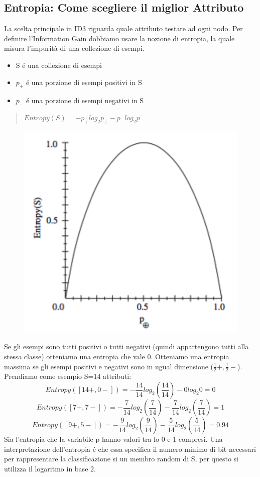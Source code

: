\documentclass{article}
\begin{document}
\subsection{Entropia: Come scegliere il miglior Attributo}
La scelta principale in ID3 riguarda quale attributo testare ad ogni nodo. Per definire l'Information Gain dobbiamo usare la nozione di entropia, la quale misura l'impurità di una collezione di esempi.
\begin{itemize}
    \item S é una collezione di esempi
    \item $p_+$ é una porzione di esempi positivi in S
    \item $p_-$ é una porzione di esempi negativi in S
\end{itemize}
\begin{quote}
    $Entropy(S)=-p_+ log_2 p_+ -p_- log_2 p_-$
\end{quote}
\begin{figure}[H]
\centering
\includegraphics[scale=0.5]{Images/entropygraph.png}
\end{figure}
Se gli esempi sono tutti positivi o tutti negativi (quindi appartengono tutti alla stessa classe) otteniamo una entropia che vale 0. Otteniamo una entropia massima se gli esempi positivi e negativi sono in ugual dimensione ($\frac{1}{2}+,\frac{1}{2}-$). \newline 
Prendiamo come esempio S=14 attributi:
\[Entropy([14+,0-])=-\frac{14}{14}log_2(\frac{14}{14}) - 0 log_2 0 = 0\]
\[Entropy([7+,7-])=-\frac{7}{14}log_2(\frac{7}{14}) - \frac{7}{14}log_2(\frac{7}{14}) = 1\]
\[Entropy([9+,5-])=-\frac{9}{14}log_2(\frac{9}{14}) - \frac{5}{14}log_2(\frac{5}{14}) = 0.94\]
Sia l'entropia che la variabile p hanno valori tra lo 0 e 1 compresi. Una interpretazione dell'entropia é che essa specifica il numero minimo di bit necessari per rappresentare la classificazione si un membro random di S, per questo si utilizza il logaritmo in base 2.
\end{document}
